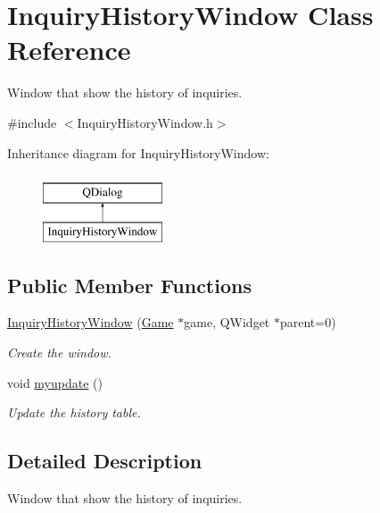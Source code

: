 \hypertarget{classInquiryHistoryWindow}{}\section{Inquiry\+History\+Window Class Reference}
\label{classInquiryHistoryWindow}


Window that show the history of inquiries.  




{\ttfamily \#include $<$Inquiry\+History\+Window.\+h$>$}

Inheritance diagram for Inquiry\+History\+Window\+:\begin{figure}[H]
\begin{center}
\leavevmode
\includegraphics[height=2.000000cm]{classInquiryHistoryWindow}
\end{center}
\end{figure}
\subsection*{Public Member Functions}
\begin{DoxyCompactItemize}
\item 
\hyperlink{classInquiryHistoryWindow_aad56e5a394ab749c4621a57016a7dfe0}{Inquiry\+History\+Window} (\hyperlink{classGame}{Game} $\ast$game, Q\+Widget $\ast$parent=0)
\begin{DoxyCompactList}\small\item\em Create the window. \end{DoxyCompactList}\item 
void \hyperlink{classInquiryHistoryWindow_ac57591d79ca9911cd085d80411a7d440}{myupdate} ()
\begin{DoxyCompactList}\small\item\em Update the history table. \end{DoxyCompactList}\end{DoxyCompactItemize}


\subsection{Detailed Description}
Window that show the history of inquiries. 

